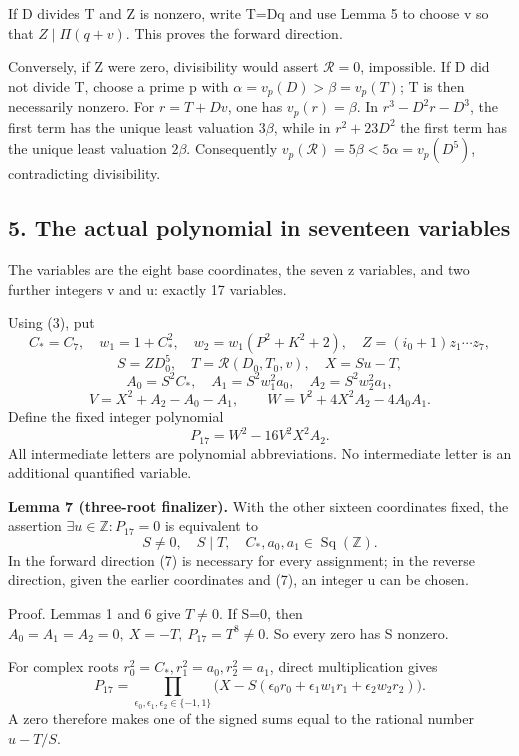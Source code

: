 If D divides T and Z is nonzero, write T=Dq and use Lemma 5 to choose v
so that \(Z\mid\Pi(q+v)\). This proves the forward direction.

Conversely, if Z were zero, divisibility would assert \(\mathcal R=0\),
impossible. If D did not divide T, choose a prime p with
\(\alpha=v_p(D)>\beta=v_p(T)\); T is then necessarily nonzero. For
\(r=T+Dv\), one has \(v_p(r)=\beta\). In \(r^3-D^2r-D^3\), the first
term has the unique least valuation \(3\beta\), while in \(r^2+23D^2\)
the first term has the unique least valuation \(2\beta\). Consequently
\(v_p(\mathcal R)=5\beta<5\alpha=v_p(D^5)\), contradicting divisibility.

\hypertarget{the-actual-polynomial-in-seventeen-variables}{%
\subsection{5. The actual polynomial in seventeen
variables}\label{the-actual-polynomial-in-seventeen-variables}}

The variables are the eight base coordinates, the seven z variables, and
two further integers v and u: exactly 17 variables.

Using (3), put \[
 C_\ast=C_7,\quad
 w_1=1+C_\ast^2,\quad
 w_2=w_1(P^2+K^2+2),\quad
 Z=(i_0+1)z_1\cdots z_7,
\] \[
 S=ZD_0^5,\quad T=\mathcal R(D_0,T_0,v),\quad X=Su-T,
\] \[
 A_0=S^2C_\ast,\quad A_1=S^2w_1^2a_0,\quad
 A_2=S^2w_2^2a_1,
\] \[
 V=X^2+A_2-A_0-A_1,\qquad
 W=V^2+4X^2A_2-4A_0A_1.
\] Define the fixed integer polynomial \[
 \boxed{P_{17}=W^2-16V^2X^2A_2.}
 \tag{6}
\] All intermediate letters are polynomial abbreviations. No
intermediate letter is an additional quantified variable.

\textbf{Lemma 7 (three-root finalizer).} With the other sixteen
coordinates fixed, the assertion \(\exists u\in\mathbb Z:P_{17}=0\) is
equivalent to \[
 S\ne0,\quad S\mid T,\quad
 C_\ast,a_0,a_1\in\operatorname{Sq}(\mathbb Z).
 \tag{7}
\] In the forward direction (7) is necessary for every assignment; in
the reverse direction, given the earlier coordinates and (7), an integer
u can be chosen.

Proof. Lemmas 1 and 6 give \(T\ne0\). If S=0, then
\(A_0=A_1=A_2=0,\ X=-T,\ P_{17}=T^8\ne0\). So every zero has S nonzero.

For complex roots \(r_0^2=C_\ast,r_1^2=a_0,r_2^2=a_1\), direct
multiplication gives \[
 P_{17}=\prod_{\epsilon_0,\epsilon_1,\epsilon_2\in\{-1,1\}}
 \big(X-S(\epsilon_0r_0+\epsilon_1w_1r_1+\epsilon_2w_2r_2)\big).
 \tag{8}
\] A zero therefore makes one of the signed sums equal to the rational
number \(u-T/S\).

